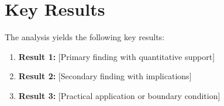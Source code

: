 %
%
%
%
%
%



\section{Key Results}
\label{sec:srl-results}

The analysis yields the following key results:

\begin{enumerate}
    \item \textbf{Result 1:} [Primary finding with quantitative support]
    \item \textbf{Result 2:} [Secondary finding with implications]
    \item \textbf{Result 3:} [Practical application or boundary condition]
\end{enumerate}


